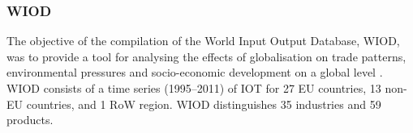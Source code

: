 \subsubsection{WIOD}

The objective of the compilation of the World Input Output Database, WIOD, was
to provide a tool for analysing the effects of globalisation on trade patterns,
environmental pressures and socio-economic development on a global level \cite{timmer_world_2012}. WIOD consists of a time series (1995–2011) of IOT for 27 EU
countries, 13 non-EU countries, and 1 RoW region. WIOD distinguishes 35
industries and 59 products.

